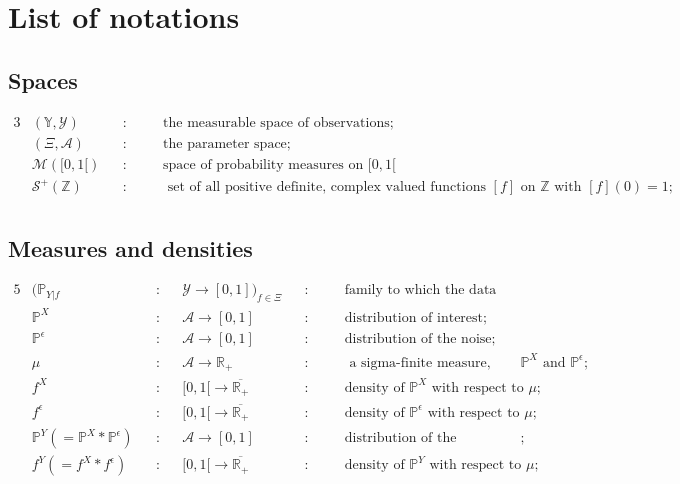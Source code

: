 \chapter*{List of notations}

\section*{Spaces}
\begin{alignat*}{3}
& \left(\mathds{Y}, \mathcal{Y}\right) &&: && \quad \text{the measurable space of observations};\\
& \left(\Xi, \mathcal{A}\right) &&: && \quad \text{the parameter space};\\
& \mathcal{M}([0, 1[) && : && \quad \text{space of probability measures on } [0, 1[\\
& \mathcal{S}^{+}(\mathds{Z}) && : && \quad \text{ set of all positive definite, complex valued functions } [f] \text{ on } \mathds{Z} \text{ with } [f](0) = 1;\\
\end{alignat*}

\section*{Measures and densities}
\begin{alignat*}{5}
& (\mathds{P}_{Y \vert f} &&:&& \mathcal{Y} \rightarrow [0,1])_{f \in \Xi} &&:&& \quad \text{family to which the data distribution belongs}\\
& \mathds{P}^{X} &&:&& \mathcal{A} \rightarrow [0,1] &&: && \quad \text{distribution of interest};\\
& \mathds{P}^{\epsilon}&&:&& \mathcal{A} \rightarrow [0,1] &&: && \quad \text{distribution of the noise};\\
& \mu&&:&& \mathcal{A} \rightarrow \mathds{R}_{+} &&: && \quad \text{ a sigma-finite measure, dominating both } \mathds{P}^{X} \text{ and } \mathds{P}^{\epsilon};\\
& f^{X}&&:&& [0, 1[ \rightarrow \overline{\mathds{R}_{+}} &&: && \quad \text{density of } \mathds{P}^{X} \text{ with respect to } \mu;\\
& f^{\epsilon}&&:&& [0, 1[ \rightarrow \overline{\mathds{R}_{+}} &&: && \quad \text{density of } \mathds{P}^{\epsilon} \text{ with respect to } \mu;\\
& \mathds{P}^{Y} (=\mathds{P}^{X}*\mathds{P}^{\epsilon})&&:&& \mathcal{A} \rightarrow [0,1] &&: && \quad \text{distribution of the observations};\\
& f^{Y}(=f^{X}*f^{\epsilon})&&:&& [0, 1[ \rightarrow \overline{\mathds{R}_{+}} &&: && \quad \text{density of } \mathds{P}^{Y} \text{ with respect to } \mu;\\
\end{alignat*}


